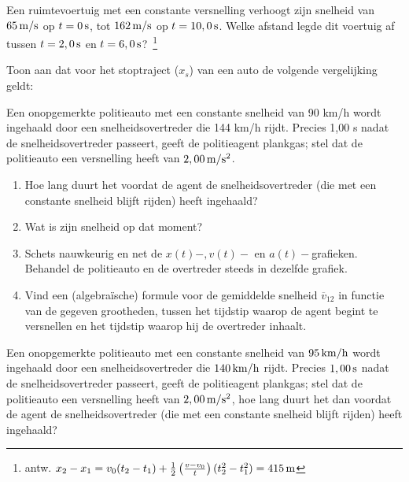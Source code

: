 \begin{exercise} Een ruimtevoertuig met een constante versnelling verhoogt
zijn snelheid van $65\rm\,m/s$ op $t=0\rm\,s$, tot $162\rm\,m/s$ op
$t=10,0\rm\,s$. Welke afstand legde dit voertuig af tussen
$t=2,0\rm\,s$ en $t=6,0\rm\,s$?~\footnote{antw.
$x_2-x_1=v_0(t_2-t_1)+\frac{1}{2}\left(\frac{v-v_0}{t}\right)(t_2^2-t_1^2)=415\rm\,m$}



\end{exercise}

\begin{exercise} Toon aan dat voor het stoptraject ($x_s$) van een auto de volgende vergelijking geldt:

\end{exercise}

\begin{exercise} Een onopgemerkte politieauto met
een constante snelheid van 90 km/h wordt ingehaald door een
snelheidsovertreder die 144 km/h rijdt. Precies 1,00 s nadat de
snelheidsovertreder passeert, geeft de politieagent plankgas; stel
dat de politieauto een versnelling heeft van $2,00\rm\,m/s^2$.
\begin{enumerate}
\item Hoe lang duurt het voordat de agent de snelheidsovertreder
(die met een constante snelheid blijft rijden) heeft ingehaald?
\item Wat is zijn snelheid op dat moment?
\item Schets nauwkeurig en net de $x(t)-,v(t)-$ en $a(t)-$grafieken.
Behandel de politieauto en de overtreder steeds in dezelfde grafiek.
\item Vind een (algebra\"ische) formule voor de gemiddelde snelheid $\overline{v}_{12}$ in
functie van de gegeven grootheden, tussen het tijdstip waarop de
agent begint te versnellen en het tijdstip waarop hij de overtreder
inhaalt.
\end{enumerate}

\end{exercise}

\begin{exercise} Een onopgemerkte politieauto met een constante snelheid van $95\rm\,km/h$ wordt ingehaald door een snelheidsovertreder die $140\rm\,km/h$ rijdt. Precies $1,00\rm\,s$ nadat de snelheidsovertreder passeert, geeft de politieagent plankgas; stel dat de politieauto een versnelling heeft van $2,00\rm\,m/s^2$, hoe lang duurt het dan voordat de agent de snelheidsovertreder (die met een constante snelheid blijft rijden) heeft ingehaald? 


\end{exercise}

